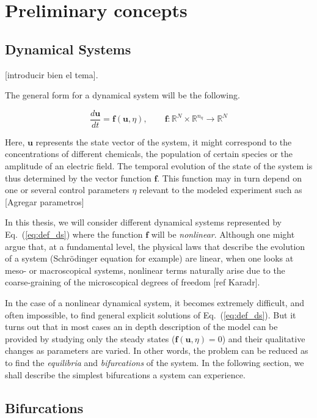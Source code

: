 \chapter{Preliminary concepts}

\section{Dynamical Systems}

[introducir bien el tema]. 

The general form for a dynamical system will be the following.

\begin{equation}
    \dfrac{d\bm{u}}{dt} = \bm{f}(\bm{u}, \eta), \qquad \bm{f} : \mathbb{R}^N \times \mathbb{R}^{n_\eta} \to \mathbb{R}^N
    \label{eq:def_ds}
\end{equation}

Here, $\bm{u}$ represents the state vector of the system, it might correspond to the
concentrations of different chemicals, the population of certain species or the amplitude
of an electric field. The temporal evolution of the state of the system is thus determined by 
the vector function $\bm{f}$. This function may in turn depend on one or several control
parameters $\eta$ relevant to the modeled experiment such as
[Agregar parametros]

In this thesis, we will consider different dynamical systems represented by Eq.~(\ref{eq:def_ds}) where the function
$\bm{f}$ will be {\em nonlinear}. Although one might argue that, at a fundamental level, the physical laws
that describe the evolution of a system (Schrödinger equation for example) are linear, when one looks at meso- or macroscopical
systems, nonlinear terms naturally arise due to the coarse-graining of the microscopical degrees of freedom [ref Karadr].


In the case of a nonlinear dynamical system, it becomes extremely difficult, and often impossible, to find
general explicit solutions of Eq.~(\ref{eq:def_ds}). But it turns out that in most cases an in depth
description of the model can be provided by studying only the steady states ($\bm{f}(\bm{u}, \eta) = 0$) and their qualitative changes as parameters 
are varied. In other words, the problem can be reduced as to find the {\em equilibria} and {\em bifurcations} of the system.
In the following section, we shall describe the simplest bifurcations a system can experience.

\section{Bifurcations}

